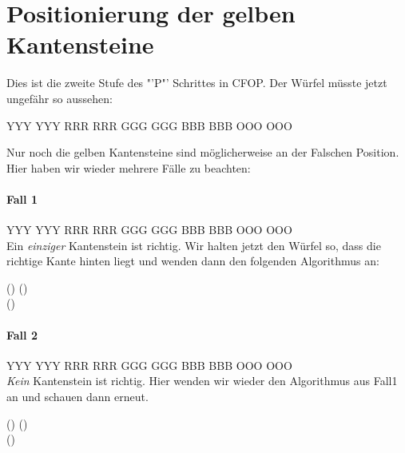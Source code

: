 \section{Positionierung der gelben Kantensteine}
Dies ist die zweite Stufe des "'P"' Schrittes in CFOP.
Der Würfel müsste jetzt ungefähr so aussehen:
\begin{center}
  \RubikCubeGreyAll%
	      {Y}{Y}{Y}
	      {Y}{Y}{Y}%
		 {R}{R}{R}
		 {R}{R}{R}%
		 {G}{G}{G}
		 {G}{G}{G}%
		{B}{B}{B}
		{B}{B}{B}%
		{O}{O}{O}
		{O}{O}{O}%
\end{center}

Nur noch die gelben Kantensteine sind möglicherweise an der Falschen Position. Hier
haben wir wieder mehrere Fälle zu beachten:

\paragraph{Fall 1}
\RubikCubeGreyAll%
            {Y}{Y}{Y}
            {Y}{Y}{Y}%
               {R}{R}{R}
	       {R}{R}{R}%
	       {G}{G}{G}
	       {G}{G}{G}%
	      {B}{B}{B}
	      {B}{B}{B}%
	      {O}{O}{O}
	      {O}{O}{O}%
\\[1em]
Ein \emph{einziger} Kantenstein ist richtig. Wir halten jetzt den Würfel so, dass
die richtige Kante hinten liegt und wenden dann den folgenden Algorithmus an:
\begin{center}
	\sffamily\Large
	() () \\[1em] ()
\end{center}

\paragraph{Fall 2}
\RubikCubeGreyAll%
            {Y}{Y}{Y}
            {Y}{Y}{Y}%
               {R}{R}{R}
	       {R}{R}{R}%
	       {G}{G}{G}
	       {G}{G}{G}%
	      {B}{B}{B}
	      {B}{B}{B}%
	      {O}{O}{O}
	      {O}{O}{O}%
\\[1em]
\emph{Kein} Kantenstein ist richtig. Hier wenden wir wieder den Algorithmus aus
Fall1 an und schauen dann erneut.
\begin{center}
	\sffamily\Large
	() () \\[1em] ()
\end{center}

